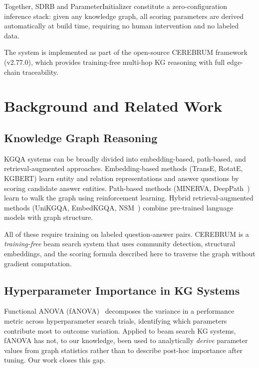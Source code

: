\documentclass[11pt,a4paper]{article}
\begin{document}
Together, SDRB and ParameterInitializer constitute a zero-configuration
inference stack: given any knowledge graph, all scoring parameters are
derived automatically at build time, requiring no human intervention and
no labeled data.

The system is implemented as part of the open-source CEREBRUM framework
(v2.77.0), which provides training-free multi-hop KG reasoning with
full edge-chain traceability.

\section{Background and Related Work}
\label{sec:background}

\subsection{Knowledge Graph Reasoning}

KGQA systems can be broadly divided into embedding-based, path-based,
and retrieval-augmented approaches.
Embedding-based methods (TransE, RotatE, KGBERT) learn entity and relation
representations and answer questions by scoring candidate answer entities.
Path-based methods (MINERVA, DeepPath~\cite{xiong2017deeppath})
learn to walk the graph using reinforcement learning.
Hybrid retrieval-augmented methods
(UniKGQA, EmbedKGQA, NSM~\cite{he2021improving})
combine pre-trained language models with graph structure.

All of these require training on labeled question-answer pairs.
CEREBRUM is a \emph{training-free} beam search system that uses community
detection, structural embeddings, and the scoring formula described here
to traverse the graph without gradient computation.

\subsection{Hyperparameter Importance in KG Systems}

Functional ANOVA (fANOVA)~\cite{hutter2014efficient} decomposes the
variance in a performance metric across hyperparameter search trials,
identifying which parameters contribute most to outcome variation.
Applied to beam search KG systems, fANOVA has not, to our knowledge,
been used to analytically \emph{derive} parameter values from graph
statistics rather than to describe post-hoc importance after tuning.
Our work closes this gap.
\end{document}
